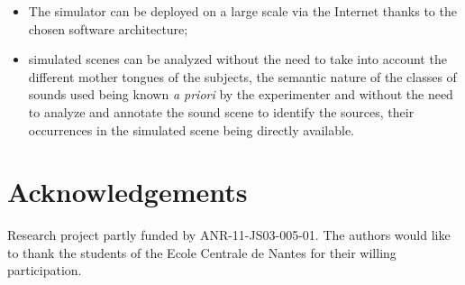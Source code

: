 \documentclass[preprint,12pt]{elsarticle}
\newcommand{\nm}[1]{\textcolor{magenta}{#1}}
\begin{document}

\begin{itemize}
\item The simulator can be deployed on a large scale via the Internet thanks to the chosen software architecture;
\item simulated scenes can be analyzed without the need to take into account the different mother tongues of the subjects, the semantic nature of the classes of sounds used being known \emph{a priori} by the experimenter and without the need to analyze and annotate the sound scene to identify the sources, their occurrences in the simulated scene being directly available.
\end{itemize}



\section*{\normalsize Acknowledgements}
\setlength{\parindent}{0.7cm}
Research project partly funded by ANR-11-JS03-005-01. The authors would like to thank the students of the Ecole Centrale de Nantes for their willing participation.


\end{document}
